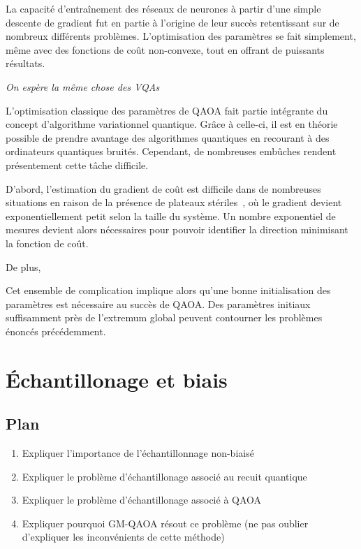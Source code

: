 La capacité d'entraînement des réseaux de neurones à partir d'une simple descente de gradient fut en partie à l'origine de leur succès retentissant sur de nombreux différents problèmes. L'optimisation des paramètres se fait simplement, même avec des fonctions de coût non-convexe, tout en offrant de puissants résultats.

\textcolor{mydarkred}{\textit{On espère la même chose des VQAs}}

L'optimisation classique des paramètres de QAOA fait partie intégrante du concept d'algorithme variationnel quantique. Grâce à celle-ci, il est en théorie possible de prendre avantage des algorithmes quantiques en recourant à des ordinateurs quantiques bruités. Cependant, de nombreuses embûches rendent présentement cette tâche difficile. 

D'abord, l'estimation du gradient de coût est difficile dans de nombreuses situations en raison de la présence de plateaux stériles~\cite{mccleanBarrenPlateausQuantum2018a, laroccaReviewBarrenPlateaus2024}, où le gradient devient exponentiellement petit selon la taille du système. Un nombre exponentiel de mesures devient alors nécessaires pour pouvoir identifier la direction minimisant la fonction de coût.

De plus, 

Cet ensemble de complication implique alors qu'une bonne initialisation des paramètres est nécessaire au succès de QAOA. Des paramètres initiaux suffisamment près de l'extremum global peuvent contourner les problèmes énoncés précédemment. 


\section{Échantillonage et biais}

\subsection*{Plan}

\begin{enumerate}
    \item Expliquer l'importance de l'échantillonnage non-biaisé
    \item Expliquer le problème d'échantillonage associé au recuit quantique
    \item Expliquer le problème d'échantillonage associé à QAOA
    \item Expliquer pourquoi GM-QAOA résout ce problème (ne pas oublier d'expliquer les inconvénients de cette méthode)
\end{enumerate}

